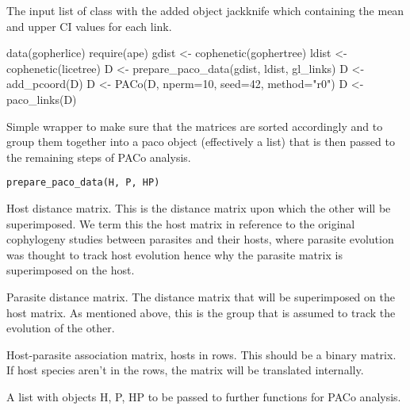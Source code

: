 \documentclass[letterpaper]{book}
\begin{document}
%
\begin{Value}
The input list of class  with the added object jackknife which containing the mean and upper CI values for each link.
\end{Value}
%
\begin{Examples}
\begin{ExampleCode}
data(gopherlice)
require(ape)
gdist <- cophenetic(gophertree)
ldist <- cophenetic(licetree)
D <- prepare_paco_data(gdist, ldist, gl_links)
D <- add_pcoord(D)
D <- PACo(D, nperm=10, seed=42, method="r0")
D <- paco_links(D)
\end{ExampleCode}
\end{Examples}
%
\begin{Description}\relax
Simple wrapper to make sure that the matrices are sorted accordingly and to group them together into a paco object (effectively a list) that is then passed to the remaining steps of PACo analysis.
\end{Description}
%
\begin{Usage}
\begin{verbatim}
prepare_paco_data(H, P, HP)
\end{verbatim}
\end{Usage}
%
\begin{Arguments}
\begin{ldescription}
\item[\code{H}] Host distance matrix. This is the distance matrix upon which the other will be superimposed. We term this the host matrix in reference to the original cophylogeny studies between parasites and their hosts, where parasite evolution was thought to track host evolution hence why the parasite matrix is superimposed on the host.

\item[\code{P}] Parasite distance matrix. The distance matrix that will be superimposed on the host matrix. As mentioned above, this is the group that is assumed to track the evolution of the other.

\item[\code{HP}] Host-parasite association matrix, hosts in rows. This should be a binary matrix. If host species aren't in the rows, the matrix will be translated internally.
\end{ldescription}
\end{Arguments}
%
\begin{Value}
A list with objects H, P, HP to be passed to further functions for PACo analysis.
\end{Value}
\end{document}
